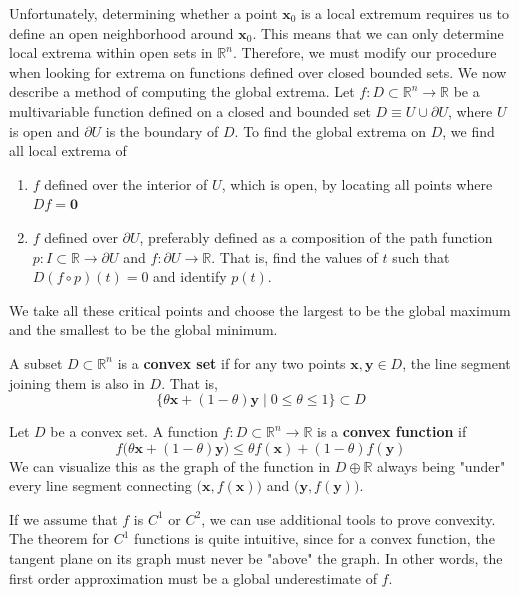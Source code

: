   Unfortunately, determining whether a point $\mathbf{x}_0$ is a local extremum requires us to define an open neighborhood around $\mathbf{x}_0$. This means that we can only determine local extrema within open sets in $\mathbb{R}^n$. Therefore, we must modify our procedure when looking for extrema on functions defined over closed bounded sets. We now describe a method of computing the global extrema. Let $f: D \subset \mathbb{R}^n \longrightarrow \mathbb{R}$ be a multivariable function defined on a closed and bounded set $D \equiv U \cup \partial U$, where $U$ is open and $\partial U$ is the boundary of $D$. To find the global extrema on $D$, we find all local extrema of 
  \begin{enumerate}
      \item $f$ defined over the interior of $U$, which is open, by locating all points where $D f = \mathbf{0}$ 
      \item $f$ defined over $\partial U$, preferably defined as a composition of the path function $p: I \subset \mathbb{R} \longrightarrow \partial U$ and $f: \partial U \longrightarrow \mathbb{R}$. That is, find the values of $t$ such that $D (f \circ p) (t) = 0$ and identify $p(t)$. 
  \end{enumerate}
  We take all these critical points and choose the largest to be the global maximum and the smallest to be the global minimum. 

  \begin{definition}
  A subset $D \subset \mathbb{R}^n$ is a \textbf{convex set} if for any two points $\mathbf{x}, \mathbf{y} \in D$, the line segment joining them is also in $D$. That is, 
  \[\{ \theta \mathbf{x} + (1 - \theta) \mathbf{y} \mid 0 \leq \theta \leq 1\} \subset D\]
  \end{definition}

  \begin{definition}
  Let $D$ be a convex set. A function $f: D \subset \mathbb{R}^n \longrightarrow \mathbb{R}$ is a \textbf{convex function} if 
  \[f\big( \theta \mathbf{x} + (1 - \theta) \mathbf{y} \big) \leq \theta f(\mathbf{x}) + (1 - \theta) f(\mathbf{y})\]
  We can visualize this as the graph of the function in $D \oplus \mathbb{R}$ always being "under" every line segment connecting $\big( \mathbf{x}, f(\mathbf{x})\big)$ and $\big( \mathbf{y}, f(\mathbf{y}) \big)$. 
  \end{definition}

  If we assume that $f$ is $C^1$ or $C^2$, we can use additional tools to prove convexity. The theorem for $C^1$ functions is quite intuitive, since for a convex function, the tangent plane on its graph must never be "above" the graph. In other words, the first order approximation must be a global underestimate of $f$. 

